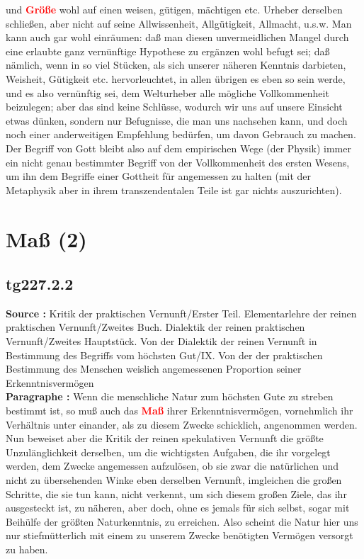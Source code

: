 \documentclass[a4paper,12pt,twoside]{book}
\newcommand{\match}[1]{\textcolor{red}{\textbf{#1}}}
\newcommand{\unnumberedsection}[1]{
	\section*{#1}
	\addcontentsline{toc}{section}{#1}
	\markright{#1}
}
\begin{document}
und \match{Größe} wohl auf einen weisen, gütigen, mächtigen etc. Urheber derselben schließen, aber nicht auf seine Allwissenheit, Allgütigkeit, Allmacht, u.s.w. Man kann auch gar wohl einräumen: daß man diesen unvermeidlichen Mangel durch eine erlaubte ganz vernünftige Hypothese zu ergänzen wohl befugt sei; daß nämlich, wenn in so viel Stücken, als sich unserer näheren Kenntnis darbieten, Weisheit, Gütigkeit etc. hervorleuchtet, in allen übrigen es eben so sein werde, und es also vernünftig sei, dem Welturheber alle mögliche Vollkommenheit beizulegen; aber das sind keine Schlüsse, wodurch wir uns auf unsere Einsicht etwas dünken, sondern nur Befugnisse, die man uns nachsehen kann, und doch noch einer anderweitigen Empfehlung bedürfen, um davon Gebrauch zu machen. Der Begriff von Gott bleibt also auf dem empirischen Wege (der Physik) immer ein nicht genau bestimmter Begriff von der Vollkommenheit des ersten Wesens, um ihn dem Begriffe einer Gottheit für angemessen zu halten (mit der Metaphysik aber in ihrem transzendentalen Teile ist gar nichts auszurichten). 
	
	\unnumberedsection{Maß (2)} 
	\subsection*{tg227.2.2} 
	\textbf{Source : }Kritik der praktischen Vernunft/Erster Teil. Elementarlehre der reinen praktischen Vernunft/Zweites Buch. Dialektik der reinen praktischen Vernunft/Zweites Hauptstück. Von der Dialektik der reinen Vernunft in Bestimmung des Begriffs vom höchsten Gut/IX. Von der der praktischen Bestimmung des Menschen weislich angemessenen Proportion seiner Erkenntnisvermögen\\  
	
	\textbf{Paragraphe : }Wenn die menschliche Natur zum höchsten Gute zu streben bestimmt ist, so muß auch das \match{Maß} ihrer Erkenntnisvermögen, vornehmlich ihr Verhältnis unter einander, als zu diesem Zwecke schicklich, angenommen werden. Nun beweiset aber die Kritik der reinen spekulativen Vernunft die größte Unzulänglichkeit derselben, um die wichtigsten Aufgaben, die ihr vorgelegt werden, dem Zwecke angemessen aufzulösen, ob sie zwar die natürlichen und nicht zu übersehenden Winke eben derselben Vernunft, imgleichen die großen Schritte, die sie tun kann, nicht verkennt, um sich diesem großen Ziele, das ihr ausgesteckt ist, zu näheren, aber doch, ohne es jemals für sich selbst, sogar mit Beihülfe der größten Naturkenntnis, zu erreichen. Also scheint die Natur hier uns nur stiefmütterlich mit einem zu unserem Zwecke benötigten Vermögen versorgt zu haben. 
	
\end{document}
